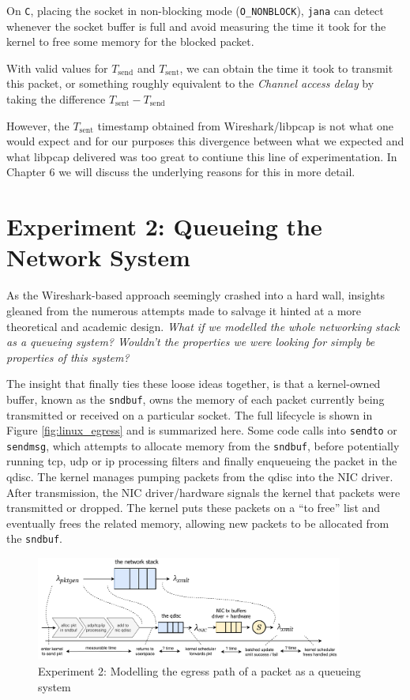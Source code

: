 On \texttt{C}, placing the socket in non-blocking mode (\texttt{O\_NONBLOCK}),
\texttt{jana} can detect whenever the socket buffer is full and avoid
measuring the time it took for the kernel to free some memory for the blocked
packet.

With valid values for $T_\text{send}$ and $T_\text{sent}$, we can obtain the
time it took to transmit this packet, or something roughly equivalent to the
\emph{Channel access delay} by taking the difference $T_\text{sent} -
T_\text{send}$

However, the $T_\text{sent}$ timestamp obtained from Wireshark/libpcap is not
what one would expect and for our purposes this divergence between what we
expected and what libpcap delivered was too great to contiune this line of
experimentation. In Chapter 6 we will discuss the underlying reasons for this
in more detail.

\section{Experiment 2: Queueing the Network System} \label{sec:experiment2}

As the Wireshark-based approach seemingly crashed into a hard wall, insights
gleaned from the numerous attempts made to salvage it hinted at a more
theoretical and academic design. \emph{What if we modelled the whole
networking stack as a queueing system? Wouldn't the properties we were looking
for simply be properties of this system?}

The insight that finally ties these loose ideas together, is that a
kernel-owned buffer, known as the \texttt{sndbuf}, owns the memory of each
packet currently being transmitted or received on a particular socket. The
full lifecycle is shown in Figure \ref{fig:linux_egress} and is summarized
here. Some code calls into \texttt{sendto} or \texttt{sendmsg}, which attempts
to allocate memory from the \texttt{sndbuf}, before potentially running tcp,
udp or ip processing filters and finally enqueueing the packet in the qdisc.
The kernel manages pumping packets from the qdisc into the NIC driver. After
transmission, the NIC driver/hardware signals the kernel that packets were
transmitted or dropped. The kernel puts these packets on a ``to free'' list
and eventually frees the related memory, allowing new packets to be allocated
from the \texttt{sndbuf}.


\begin{figure}
\center
\includegraphics[width=0.9\textwidth]{images/the-network-queue.pdf}
\caption{Experiment 2: Modelling the egress path of a packet as a queueing system}
\label{fig:exp2_overview}
\end{figure}

